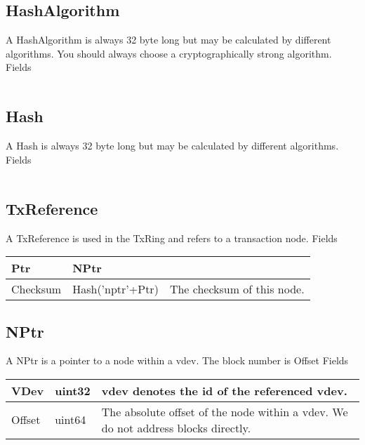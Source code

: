 \subsection{HashAlgorithm}
A HashAlgorithm is always 32 byte long but may be calculated by different algorithms. You should always choose a cryptographically strong algorithm.
Fields
\begin{table}[htp]
\centering
\begin{tabular}{l|l|l}
\end{tabular}
\end{table}
\subsection{Hash}
A Hash is always 32 byte long but may be calculated by different algorithms.
Fields
\begin{table}[htp]
\centering
\begin{tabular}{l|l|l}
\end{tabular}
\end{table}
\subsection{TxReference}
A TxReference is used in the TxRing and refers to a transaction node.
Fields
\begin{table}[htp]
\centering
\begin{tabular}{l|l|l}
Ptr & NPtr & \\ \hline
Checksum & Hash('nptr'+Ptr) & The checksum of this node.\\ \hline
\end{tabular}
\end{table}
\subsection{NPtr}
A NPtr is a pointer to a node within a vdev. The block number is Offset %
Fields
\begin{table}[htp]
\centering
\begin{tabular}{l|l|l}
VDev & uint32 & vdev denotes the id of the referenced vdev.\\ \hline
Offset & uint64 & The absolute offset of the node within a vdev. We do not address blocks directly.\\ \hline
\end{tabular}
\end{table}
